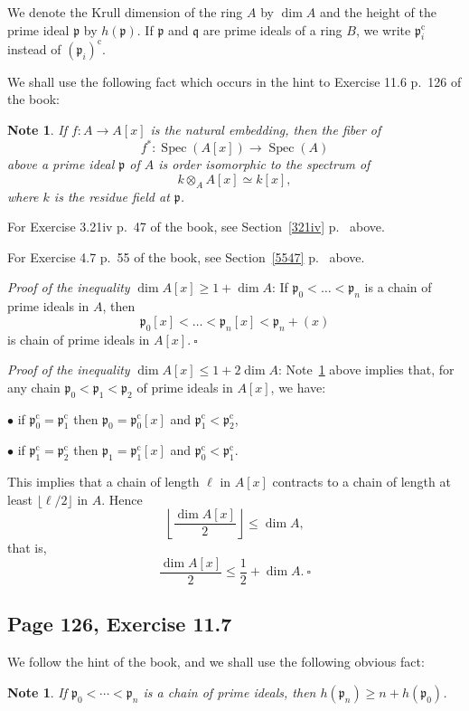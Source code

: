 \documentclass[parskip=half,fontsize=12pt]{scrartcl}%
\newcommand{\oo}{\operatorname}\newcommand{\ooo}{\operatorname*}
\newcommand{\mf}{\mathfrak}
\newcommand{\ppp}{\mf p}
\newcommand{\qqq}{\mf q}
\newtheorem{note}[thm]{Note}
\begin{document}
We denote the Krull dimension of the ring $A$ by $\dim A$ and the height of the prime ideal $\ppp$ by $h(\ppp)$. If $\ppp$ and $\qqq$ are prime ideals of a ring $B$, we write %
$\ppp_i^{\oo c}$ instead of $(\ppp_i)^{\oo c}$. 

We shall use the following fact which occurs in the hint to Exercise 11.6 p.~126 of the book:

\begin{note}\label{116b}
If $f:A\to A[x]$ is the natural embedding, then the fiber of 
$$
f^*:\oo{Spec}(A[x])\to\oo{Spec}(A)
$$ 
above a prime ideal $\ppp$ of $A$ is order isomorphic to the spectrum of
$$
k\otimes_AA[x]\simeq k[x],
$$ 
where $k$ is the residue field at $\ppp$.
\end{note}

For Exercise 3.21iv p.~47 of the book, see Section~\ref{321iv} p.~\pageref{321iv} above. 

For Exercise 4.7 p.~55 of the book, see Section~\ref{5547} p.~\pageref{5547} above. 

\emph{Proof of the inequality} $\dim A[x]\ge1+\dim A$: If 
$
\ppp_0<\dots<\ppp_n
$ 
is a chain of prime ideals in $A$, then 
$$
\ppp_0[x]<\dots<\ppp_n[x]<\ppp_n+(x)
$$ 
is chain of prime ideals in $A[x].\ \square$

\emph{Proof of the inequality} $\dim A[x]\le1+2\dim A$: Note~\ref{116b} above implies that, for any chain $\ppp_0<\ppp_1<\ppp_2$ of prime ideals in $A[x]$, we have:

$\bullet$ if $\ppp_0^{\oo c}=\ppp_1^{\oo c}$ then $\ppp_0=\ppp_0^{\oo c}[x]$ and $\ppp_1^{\oo c}<\ppp_2^{\oo c}$,

$\bullet$ if $\ppp_1^{\oo c}=\ppp_2^{\oo c}$ then $\ppp_1=\ppp_1^{\oo c}[x]$ and $\ppp_0^{\oo c}<\ppp_1^{\oo c}$.

This implies that a chain of length $\ell$ in $A[x]$ contracts to a chain of length at least $\lfloor\ell/2\rfloor$ in $A$. Hence 
$$
\left\lfloor\frac{\dim A[x]}2\right\rfloor\le\dim A,
$$ 
that is,
$$
\frac{\dim A[x]}2\le\frac12+\dim A.\ \square
$$

\subsection{Page 126, Exercise 11.7}%

We follow the hint of the book, and we shall use the following obvious fact: 

\begin{note}\label{116a}
If $\ppp_0<\cdots<\ppp_n$ is a chain of prime ideals, then $h(\ppp_n)\ge n+h(\ppp_0)$. 
\end{note}
\end{document}

